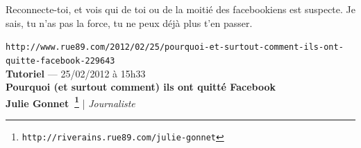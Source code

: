 \documentclass[11pt,twoside,a4paper]{article}
\begin{document}
Reconnecte-toi, et vois qui de toi ou de la moiti{\'e} des facebookiens est suspecte. Je sais, tu n'as pas la force, tu ne peux d{\'e}j{\`a} plus t'en passer. ~\\

\clearpage

\texttt{http://www.rue89.com/2012/02/25/pourquoi-et-surtout-comment-ils-ont-quitte-facebook-229643}~\\

\textbf{Tutoriel} --- 25/02/2012 {\`a} 15h33~\\

\textbf{\LARGE Pourquoi (et surtout comment) ils ont quitt{\'e} Facebook}~\\

{\small \textbf{Julie Gonnet~\footnote{\texttt{http://riverains.rue89.com/julie-gonnet}}} | \emph{Journaliste} }~\\
\end{document}

